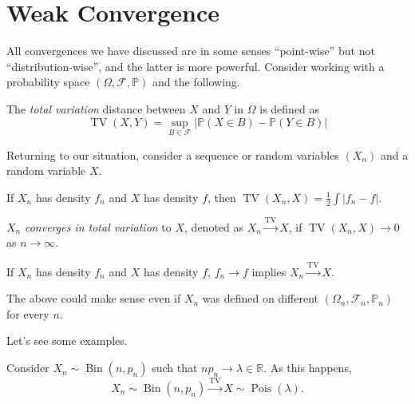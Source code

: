 \section{Weak Convergence}
All convergences we have discussed are in some senses ``point-wise'' but not ``distribution-wise'', and the latter is more powerful. Consider working with a probability space \((\Omega , \mathscr{F} , \mathbb{P} )\) and the following.

\begin{definition}\label{def:total-variation}
	The \emph{total variation} distance between \(X\) and \(Y\) in \(\Omega \) is defined as
	\[
		\operatorname{TV}(X, Y) = \sup_{B \in \mathscr{F} } \left\vert \mathbb{P} (X \in B) - \mathbb{P} (Y \in B) \right\vert
	\]
\end{definition}

Returning to our situation, consider a sequence or random variables \((X_n)\) and a random variable \(X\).

\begin{remark}
	If \(X_n\) has density \(f_n\) and \(X\) has density \(f\), then \(\operatorname{TV}(X_n, X) = \frac{1}{2} \int \vert f_n - f \vert \).
\end{remark}

\begin{definition}\label{def:convergence-in-total-variation}
	\(X_n\) \emph{converges in total variation} to \(X\), denoted as \(X_n \overset{\operatorname{TV}}{\to } X\), if \(\operatorname{TV}(X_n, X) \to 0\) as \(n \to \infty \).
\end{definition}

\begin{remark}
	If \(X_n\) has density \(f_n\) and \(X\) has density \(f\), \(f_n \to f\) implies \(X_n \overset{\operatorname{TV} }{\to } X\).
\end{remark}

\begin{note}
	The above could make sense even if \(X_n\) was defined on different \((\Omega _n , \mathscr{F} _n, \mathbb{P} _n)\) for every \(n\).
\end{note}

Let's see some examples.

\begin{eg}
	Consider \(X_n \sim \operatorname{Bin}(n, p_n) \) such that \(n p_n \to \lambda \in \mathbb{R} \). As this happens,
	\[
		X_n \sim \operatorname{Bin}(n, p_n)
		\overset{\operatorname{TV} }{\to } X \sim \operatorname{Pois}(\lambda ).
	\]
\end{eg}

